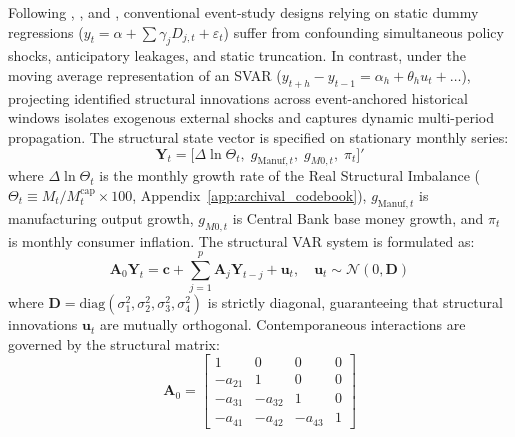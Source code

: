 Following \citet{ChenFangLiu2021}, \citet{Wright2012}, and \citet{KilianLutkepohl2017}, conventional event-study designs relying on static dummy regressions ($y_t = \alpha + \sum \gamma_j D_{j,t} + \varepsilon_t$) suffer from confounding simultaneous policy shocks, anticipatory leakages, and static truncation. In contrast, under the moving average representation of an SVAR ($y_{t+h} - y_{t-1} = \alpha_h + \theta_h u_t + \dots$), projecting identified structural innovations across event-anchored historical windows isolates exogenous external shocks and captures dynamic multi-period propagation. The structural state vector is specified on stationary monthly series:
\begin{equation}
	\mathbf{Y}_t = \big[ \Delta \ln \Theta_t,\; g_{\text{Manuf},t},\; g_{M0,t},\; \pi_t \big]'
	\label{eq:app_b_svar_vector}
\end{equation}
where $\Delta \ln \Theta_t$ is the monthly growth rate of the Real Structural Imbalance ($\Theta_t \equiv M_t / M^{\text{cap}}_t \times 100$, Appendix~\ref{app:archival_codebook}), $g_{\text{Manuf},t}$ is manufacturing output growth, $g_{M0,t}$ is Central Bank base money growth, and $\pi_t$ is monthly consumer inflation. The structural VAR system is formulated as:
\begin{equation}
	\mathbf{A}_0 \mathbf{Y}_t = \mathbf{c} + \sum_{j=1}^p \mathbf{A}_j \mathbf{Y}_{t-j} + \mathbf{u}_t, \quad \mathbf{u}_t \sim \mathcal{N}(0, \mathbf{D})
	\label{eq:app_b_svar_system}
\end{equation}
where $\mathbf{D} = \text{diag}(\sigma_1^2, \sigma_2^2, \sigma_3^2, \sigma_4^2)$ is strictly diagonal, guaranteeing that structural innovations $\mathbf{u}_t$ are mutually orthogonal. Contemporaneous interactions are governed by the structural matrix:
\begin{equation}
	\mathbf{A}_0 = \begin{bmatrix} 1 & 0 & 0 & 0 \\ -a_{21} & 1 & 0 & 0 \\ -a_{31} & -a_{32} & 1 & 0 \\ -a_{41} & -a_{42} & -a_{43} & 1 \end{bmatrix}
	\label{eq:app_b_a0_matrix}
\end{equation}
